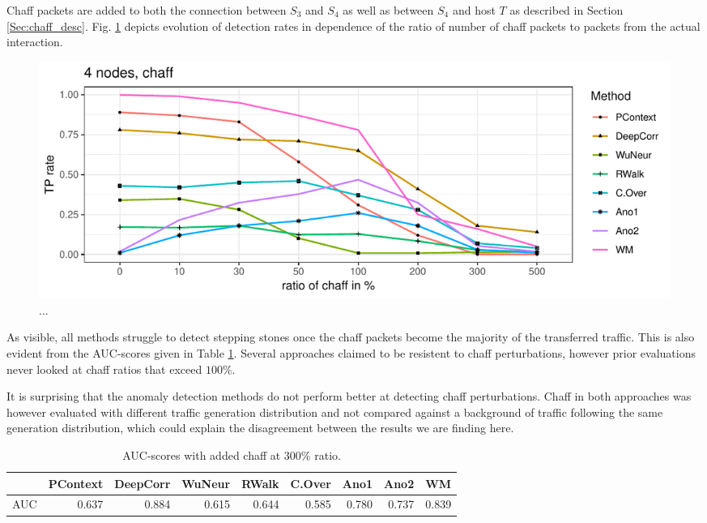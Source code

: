 \documentclass[runningheads]{llncs}\usepackage[]{graphicx}\usepackage[]{color}
\makeatletter
\def\maxwidth{ %
  \ifdim\Gin@nat@width>\linewidth
    \linewidth
  \else
    \Gin@nat@width
  \fi
}
\newenvironment{knitrout}{}{} %
\makeatother
\begin{document}
Chaff packets are added to both the connection between $S_3$ and $S_4$ as well as between $S_4$ and host $T$ as described in Section \ref{Sec:chaff_desc}. Fig. \ref{fig:Chaffdetection} depicts evolution of detection rates in dependence of the ratio of number of chaff packets to packets from the actual interaction.


\begin{knitrout}
\color{fgcolor}\begin{figure}
\includegraphics[width=\maxwidth]{figure/Chaffdetection-1} \caption[..]{...}\label{fig:Chaffdetection}
\end{figure}


\end{knitrout}

As visible, all methods struggle to detect stepping stones once the chaff packets become the majority of the transferred traffic. This is also evident from the AUC-scores given in Table \ref{Tab:AUCdelays}. Several approaches claimed to be resistent to chaff perturbations, however prior evaluations never looked at chaff ratios that exceed $100\%$. 

It is surprising that the anomaly detection methods do not perform better at detecting chaff perturbations. Chaff in both approaches was however evaluated with different traffic generation distribution and not compared against a background of traffic following the same generation distribution, which could explain the disagreement between the results we are finding here. 

\begin{table}
\centering
\begin{tabular}{l|r|r|r|r|r|r|r|r}
  \hline
 & PContext & DeepCorr & WuNeur & RWalk & C.Over & Ano1 & Ano2 & WM \\ 
  \hline
AUC & 0.637 & 0.884 & 0.615 & 0.644 & 0.585 & 0.780 & 0.737 & 0.839 \\ 
   \hline
\end{tabular}

\caption{AUC-scores with added chaff at 300\% ratio.}\label{Tab:AUCdelays}
\end{table}
\end{document}
